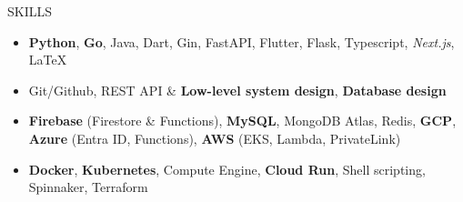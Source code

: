 \documentclass{template}
\begin{document}
\begin{rSection}{SKILLS}
\begin{itemize}
    \item \textbf{Python}, \textbf{Go}, Java, Dart, Gin, FastAPI, Flutter, Flask, Typescript, \textit{Next.js}, \LaTeX
    
    \item Git/Github, REST API \& \textbf{Low-level system design}, \textbf{Database design}

    \item \textbf{Firebase} (Firestore \& Functions), \textbf{MySQL}, MongoDB Atlas, Redis, \textbf{GCP}, \textbf{Azure} (Entra ID, Functions), \textbf{AWS} (EKS, Lambda, PrivateLink)
    
    \item \textbf{Docker}, \textbf{Kubernetes}, Compute Engine, \textbf{Cloud Run}, Shell scripting, Spinnaker, Terraform
\end{itemize}

\end{rSection}
\end{document}
